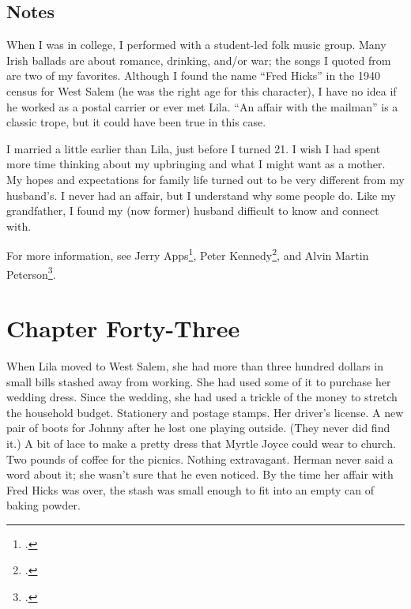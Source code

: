 \documentclass[
  letterpaper,
]{book}
\begin{document}
\section{Notes}\label{notes-44}

When I was in college, I performed with a student-led folk music group.
Many Irish ballads are about romance, drinking, and/or war; the songs I
quoted from are two of my favorites. Although I found the name ``Fred
Hicks'' in the 1940 census for West Salem (he was the right age for this
character), I have no idea if he worked as a postal carrier or ever met
Lila. ``An affair with the mailman'' is a classic trope, but it could
have been true in this case.

I married a little earlier than Lila, just before I turned 21. I wish I
had spent more time thinking about my upbringing and what I might want
as a mother. My hopes and expectations for family life turned out to be
very different from my husband's. I never had an affair, but I
understand why some people do. Like my grandfather, I found my (now
former) husband difficult to know and connect with.

For more information, see Jerry Apps\footnote{.}, Peter Kennedy\footnote{.},
and Alvin Martin Peterson\footnote{.}.


\chapter{Chapter Forty-Three}\label{chapter-forty-three}

When Lila moved to West Salem, she had more than three hundred dollars
in small bills stashed away from working. She had used some of it to
purchase her wedding dress. Since the wedding, she had used a trickle of
the money to stretch the household budget. Stationery and postage
stamps. Her driver's license. A new pair of boots for Johnny after he
lost one playing outside. (They never did find it.) A bit of lace to
make a pretty dress that Myrtle Joyce could wear to church. Two pounds
of coffee for the picnics. Nothing extravagant. Herman never said a word
about it; she wasn't sure that he even noticed. By the time her affair
with Fred Hicks was over, the stash was small enough to fit into an
empty can of baking powder.
\end{document}
